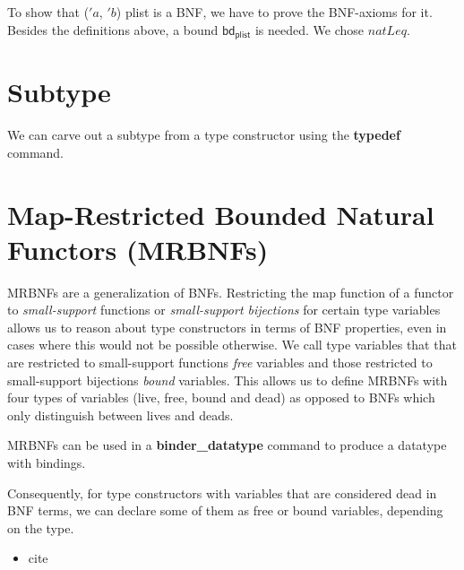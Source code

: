       To show that \textsf{($'a$, $'b$) plist} is a \ac{BNF}, we have to prove the \ac{BNF}-axioms for it. Besides the definitions above, a bound $\textsf{bd}_\textsf{plist}$ is needed. We chose $natLeq$. 
      

  \section{Subtype}
    We can carve out a subtype from a type constructor using the \textbf{typedef} command. 

  \section{Map-Restricted Bounded Natural Functors (MRBNFs)}
    \acp{MRBNF} are a generalization of \acp{BNF}. Restricting the \textsf{map} function of a functor to \textit{small-support} functions or \textit{small-support bijections} for certain type variables allows us to reason about type constructors in terms of \ac{BNF} properties, even in cases where this would not be possible otherwise. We call type variables that that are restricted to small-support functions \textit{free} variables  and those restricted to small-support bijections \textit{bound} variables. This allows us to define \acp{MRBNF} with four types of variables (live, free, bound and dead) as opposed to \acp{BNF} which only distinguish between lives and deads. 

    \acp{MRBNF} can be used in a \textbf{binder\_datatype} command to produce a datatype with bindings. 
    
    Consequently, for type constructors with variables that are considered dead in \ac{BNF} terms, we can declare some of them as free or bound variables, depending on the type.

    
  \begin{itemize}
    \item cite \cite{blanchette2019bindings}
  \end{itemize}

